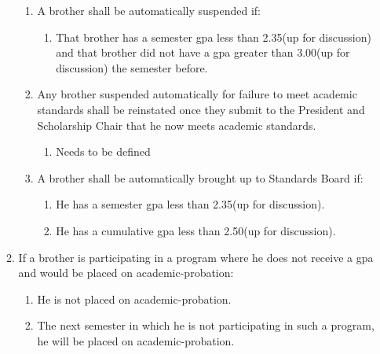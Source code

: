 \begin{enumerate}
\begin{enumerate}
\begin{enumerate}
				\item A brother shall be automatically suspended if:
				\begin{enumerate}
					\item That brother has a semester \gls{gpa} less than 2.35(up for discussion) and that brother did not have a \gls{gpa} greater than 3.00(up for discussion) the semester before.
				\end{enumerate}
				\item Any brother suspended automatically for failure to meet academic standards shall be reinstated once they submit to the President and Scholarship Chair that he now meets academic standards.
				\begin{enumerate}
					\item Needs to be defined
				\end{enumerate}
				\item A brother shall be automatically brought up to Standards Board if:
				\begin{enumerate}
					\item He has a semester \gls{gpa} less than 2.35(up for discussion).
					\item He has a cumulative \gls{gpa} less than 2.50(up for discussion).
				\end{enumerate}
			\end{enumerate}

		\item If a brother is participating in a program where he does not receive a \gls{gpa} and would be placed on \gls{academic-probation}:
			\begin{enumerate}
				\item He is not placed on \gls{academic-probation}.
				\item The next semester in which he is not participating in such a program, he will be placed on \gls{academic-probation}.
			\end{enumerate}

		\end{enumerate}
	\end{enumerate}


